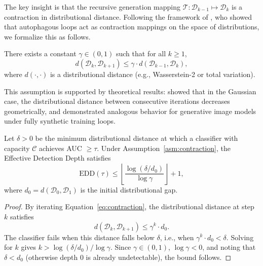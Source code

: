 The key insight is that the recursive generation mapping $\mathcal{T}: \mathcal{D}_{k-1} \mapsto \mathcal{D}_k$ is a contraction in distributional distance. Following the framework of \citet{alemohammad2024selfconsuming}, who showed that autophagous loops act as contraction mappings on the space of distributions, we formalize this as follows.

\begin{assumption}
\label{asm:contraction}
There exists a constant $\gamma \in (0, 1)$ such that for all $k \geq 1$,
\begin{equation}
    d(\mathcal{D}_k, \mathcal{D}_{k+1}) \leq \gamma \cdot d(\mathcal{D}_{k-1}, \mathcal{D}_k),
    \label{eq:contraction}
\end{equation}
where $d(\cdot, \cdot)$ is a distributional distance (e.g., Wasserstein-2 or total variation).
\end{assumption}

This assumption is supported by theoretical results: \citet{shumailov2024collapse} showed that in the Gaussian case, the distributional distance between consecutive iterations decreases geometrically, and \citet{alemohammad2024selfconsuming} demonstrated analogous behavior for generative image models under fully synthetic training loops.

\begin{theorem}
\label{thm:edd}
Let $\delta > 0$ be the minimum distributional distance at which a classifier with capacity $\mathcal{C}$ achieves AUC $\geq \tau$. Under Assumption~\ref{asm:contraction}, the Effective Detection Depth satisfies
\begin{equation}
    \text{EDD}(\tau) \leq \left\lfloor \frac{\log(\delta / d_0)}{\log \gamma} \right\rfloor + 1,
    \label{eq:edd_bound}
\end{equation}
where $d_0 = d(\mathcal{D}_0, \mathcal{D}_1)$ is the initial distributional gap.
\end{theorem}

\begin{proof}
By iterating Equation~\eqref{eq:contraction}, the distributional distance at step $k$ satisfies
\begin{equation}
    d(\mathcal{D}_k, \mathcal{D}_{k+1}) \leq \gamma^k \cdot d_0.
\end{equation}
The classifier fails when this distance falls below $\delta$, i.e., when $\gamma^k \cdot d_0 < \delta$. Solving for $k$ gives $k > \log(\delta / d_0) / \log \gamma$. Since $\gamma \in (0,1)$, $\log \gamma < 0$, and noting that $\delta < d_0$ (otherwise depth 0 is already undetectable), the bound follows.
\end{proof}

